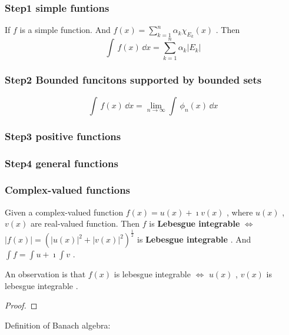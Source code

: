 \subsubsection*{Step1 simple funtions}
If $f$ is a simple function. And $f(x)=\sum\limits_{k=1}^{n}\alpha_k \chi_{E_k}(x)$ .
Then
\begin{equation*}
    \int\, f(x) \,\dd  x=\sum\limits_{k=1}^{n}\alpha_k |E_k|
\end{equation*}

\subsubsection*{Step2 Bounded funcitons supported by bounded sets}

\begin{equation*}
    \int \, f(x) \, \dd x
    =
    \lim_{n\rightarrow\infty}
    \int \,
    \phi_n(x)
    \,\dd x 
\end{equation*}

\subsubsection*{Step3 positive functions}
\subsubsection*{Step4 general functions}

\begin{theorem*}

\end{theorem*}


\subsubsection*{Complex-valued functions}
Given a complex-valued function $f(x)=u(x)+\imath v(x)$ , where $u(x)$ , $v(x)$ are real-valued function. Then $f$ is {\bfseries Lebesgue integrable} $\Leftrightarrow$ $|f(x)|=(|u(x)|^2+|v(x)|^2)^{\frac{1}{2}}$ is {\bfseries Lebesgue integrable} . And $\int f= \int u +\imath \int v$ .
\par
An observation is that $f(x)$ is lebesgue integrable $\Leftrightarrow$ $u(x)$ , $v(x)$ is lebesgue integrable .
\begin{proof}

\end{proof}

Definition of Banach algebra:

